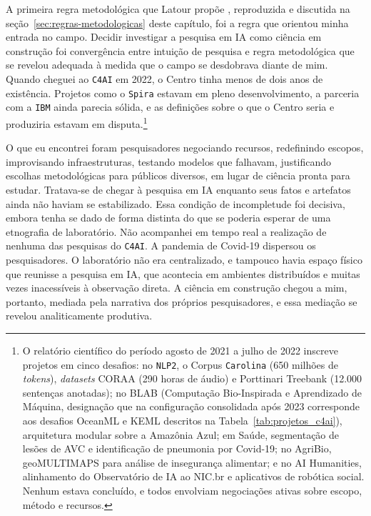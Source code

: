 A primeira regra metodológica que Latour propõe \parencite{Latour2011CienciaEmAcao}, reproduzida e discutida na seção~\ref{sec:regras-metodologicas} deste capítulo, foi a regra que orientou minha entrada no campo. Decidir investigar a pesquisa em IA como ciência em construção foi convergência entre intuição de pesquisa e regra metodológica que se revelou adequada à medida que o campo se desdobrava diante de mim. Quando cheguei ao \texttt{C4AI} em 2022, o Centro tinha menos de dois anos de existência. Projetos como o \texttt{Spira} estavam em pleno desenvolvimento, a parceria com a \texttt{IBM} ainda parecia sólida, e as definições sobre o que o Centro seria e produziria estavam em disputa.\footnote{O relatório científico do período agosto de 2021 a julho de 2022 inscreve projetos em cinco desafios: no \texttt{NLP2}, o Corpus \texttt{Carolina} (650 milhões de \textit{tokens}), \textit{datasets} CORAA (290 horas de áudio) e Porttinari Treebank (12.000 sentenças anotadas); no BLAB (Computação Bio-Inspirada e Aprendizado de Máquina, designação que na configuração consolidada após 2023 corresponde aos desafios OceanML e KEML descritos na Tabela~\ref{tab:projetos_c4ai}), arquitetura modular sobre a Amazônia Azul; em Saúde, segmentação de lesões de AVC e identificação de pneumonia por Covid-19; no AgriBio, geoMULTIMAPS para análise de insegurança alimentar; e no AI Humanities, alinhamento do Observatório de IA ao NIC.br e aplicativos de robótica social. Nenhum estava concluído, e todos envolviam negociações ativas sobre escopo, método e recursos.}

O que eu encontrei foram pesquisadores negociando recursos, redefinindo escopos, improvisando infraestruturas, testando modelos que falhavam, justificando escolhas metodológicas para públicos diversos, em lugar de ciência pronta para estudar. Tratava-se de chegar à pesquisa em IA enquanto seus fatos e artefatos ainda não haviam se estabilizado. Essa condição de incompletude foi decisiva, embora tenha se dado de forma distinta do que se poderia esperar de uma etnografia de laboratório. Não acompanhei em tempo real a realização de nenhuma das pesquisas do \texttt{C4AI}. A pandemia de Covid-19 dispersou os pesquisadores. O laboratório não era centralizado, e tampouco havia espaço físico que reunisse a pesquisa em IA, que acontecia em ambientes distribuídos e muitas vezes inacessíveis à observação direta. A ciência em construção chegou a mim, portanto, mediada pela narrativa dos próprios pesquisadores, e essa mediação se revelou analiticamente produtiva.

